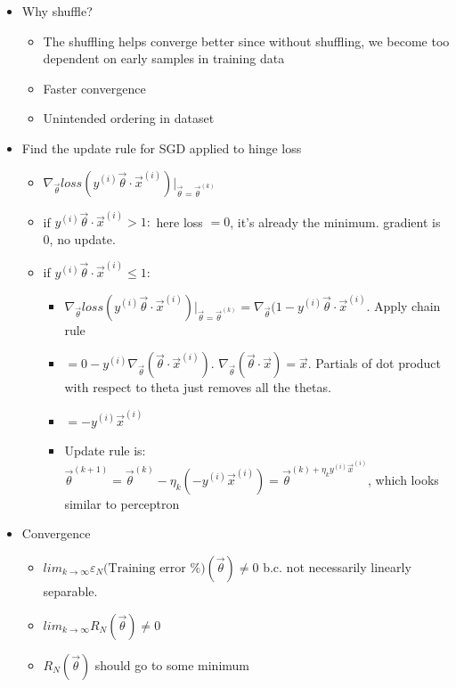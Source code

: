 \documentclass[10pt, oneside]{article}
\begin{document}
\begin{itemize}
    \item Why shuffle?
    \begin{itemize}
        \item The shuffling helps converge better since without shuffling, we become too dependent on early samples in training data
        \item Faster convergence
        \item Unintended ordering in dataset
    \end{itemize}
    \item Find the update rule for SGD applied to hinge loss
    \begin{itemize}
        \item $\nabla_{\vec \theta} loss(y^{(i)} \vec \theta \cdot \vec x^{(i)})|_{\vec \theta = \vec \theta^{(k)}}$
        \item if $y^{(i)}\vec \theta \cdot \vec x ^{(i)} > 1 : $ here loss $=0$, it's already the minimum. gradient is 0, no update.
        \item if $y^(i) \vec \theta \cdot \vec x^{(i)} \leq 1$:
        \begin{itemize}
            \item $\nabla_{\vec \theta} loss(y^{(i)} \vec \theta \cdot \vec x^{(i)})|_{\vec \theta = \vec \theta^{(k)}}=\nabla_{\vec \theta} (1-y^{(i)} \vec \theta \cdot \vec x ^{(i)}$. Apply chain rule
            \item $=0-y^{(i)} \nabla_{\vec \theta} (\vec \theta \cdot \vec x^{(i)})$. $\nabla_{\vec \theta} (\vec \theta \cdot \vec x) = \vec x$. Partials of dot product with respect to theta just removes all the thetas.
            \item $=-y^{(i)} \vec x^{(i)}$
            \item Update rule is: $\vec \theta ^{(k+1)} = \vec \theta^{(k)} -\eta_k (-y^{(i)} \vec x^{(i)})=\vec \theta^{(k) + \eta_k y^{(i)} \vec x^{(i)}}$, which looks similar to perceptron
        \end{itemize}
    \end{itemize}
    \item Convergence
    \begin{itemize}
        \item $lim_{k\rightarrow \infty} \varepsilon_N \text{(Training error \%)} (\vec \theta) \neq 0$ b.c. not necessarily linearly separable.
        \item $lim_{k\rightarrow \infty} R_N (\vec \theta) \neq 0$
        \item $R_N(\vec \theta)$  should go to some minimum

\end{itemize}
\end{itemize}
\end{document}
